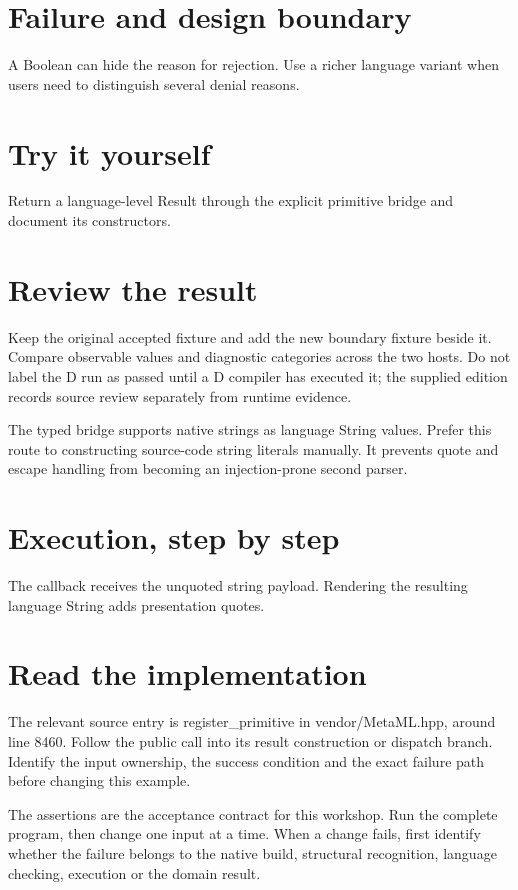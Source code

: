 
\section*{Failure and design boundary}
A Boolean can hide the reason for rejection. Use a richer language variant when users need to distinguish several denial reasons.

\section*{Try it yourself}
Return a language-level Result through the explicit primitive bridge and document its constructors.

\section*{Review the result}
Keep the original accepted fixture and add the new boundary fixture beside it. Compare observable values and diagnostic categories across the two hosts. Do not label the D run as passed until a D compiler has executed it; the supplied edition records source review separately from runtime evidence.

\clearpage
{}
The typed bridge supports native strings as language String values. Prefer this route to constructing source-code string literals manually. It prevents quote and escape handling from becoming an injection-prone second parser.


\section*{Execution, step by step}
The callback receives the unquoted string payload. Rendering the resulting language String adds presentation quotes.

\section*{Read the implementation}
The relevant source entry is register\_primitive in vendor/MetaML.hpp, around line 8460. Follow the public call into its result construction or dispatch branch. Identify the input ownership, the success condition and the exact failure path before changing this example.

The assertions are the acceptance contract for this workshop. Run the complete program, then change one input at a time. When a change fails, first identify whether the failure belongs to the native build, structural recognition, language checking, execution or the domain result.

